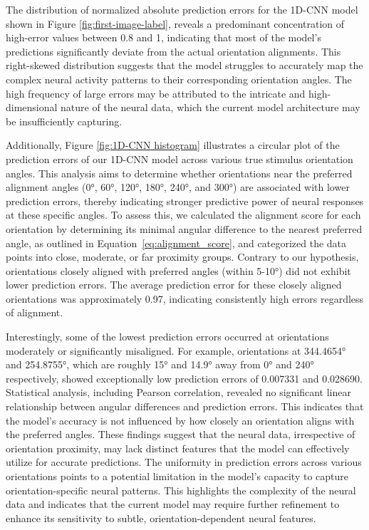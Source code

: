 \documentclass[a4paper]{article}
\begin{document}
\noindent The distribution of normalized absolute prediction errors for the 1D-CNN model shown in Figure \ref{fig:first-image-label}, reveals a predominant concentration of high-error values between 0.8 and 1, indicating that most of the model's predictions significantly deviate from the actual orientation alignments. This right-skewed distribution suggests that the model struggles to accurately map the complex neural activity patterns to their corresponding orientation angles. The high frequency of large errors may be attributed to the intricate and high-dimensional nature of the neural data, which the current model architecture may be insufficiently capturing.

Additionally, Figure \ref{fig:1D-CNN histogram} illustrates a circular plot of the prediction errors of our 1D-CNN model across various true stimulus orientation angles. This analysis aims to determine whether orientations near the preferred alignment angles (0°, 60°, 120°, 180°, 240°, and 300°) are associated with lower prediction errors, thereby indicating stronger predictive power of neural responses at these specific angles. To assess this, we calculated the alignment score for each orientation by determining its minimal angular difference to the nearest preferred angle, as outlined in Equation~\ref{eq:alignment_score},  and categorized the data points into close, moderate, or far proximity groups. Contrary to our hypothesis, orientations closely aligned with preferred angles (within 5-10°) did not exhibit lower prediction errors. The average prediction error for these closely aligned orientations was approximately 0.97, indicating consistently high errors regardless of alignment.

Interestingly, some of the lowest prediction errors occurred at orientations moderately or significantly misaligned. For example, orientations at 344.4654° and 254.8755°, which are roughly 15° and 14.9° away from 0° and 240° respectively, showed exceptionally low prediction errors of 0.007331 and 0.028690. Statistical analysis, including Pearson correlation, revealed no significant linear relationship between angular differences and prediction errors. This indicates that the model’s accuracy is not influenced by how closely an orientation aligns with the preferred angles. These findings suggest that the neural data, irrespective of orientation proximity, may lack distinct features that the model can effectively utilize for accurate predictions. The uniformity in prediction errors across various orientations points to a potential limitation in the model's capacity to capture orientation-specific neural patterns. This highlights the complexity of the neural data and indicates that the current model may require further refinement to enhance its sensitivity to subtle, orientation-dependent neural features.
\end{document}
